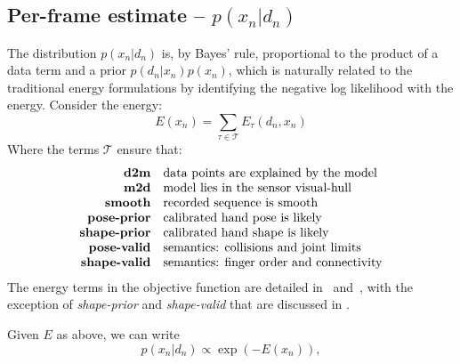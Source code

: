 \subsection{Per-frame estimate -- $p(x_n|d_n)$}
\label{sec:independent}
\label{sec:intra}
The distribution $p(x_n|d_n)$ is, by Bayes' rule, proportional to the product of a data term and a prior $p(d_n|x_n)p(x_n)$, which is naturally related to the traditional energy formulations by identifying the negative log likelihood with the energy.  Consider the energy:
% 
\begin{equation}
E(x_n) = \sum_{\tau \in \mathcal{T}} E_{\tau}(d_n, x_n) 
\label{eq:energies}
\end{equation}
% 
Where the terms $\mathcal{T}$ ensure that:
%
\begin{equation*}
\setlength{\jot}{0pt}
\begin{aligned}
\text{\textbf{d2m}} & \quad \text{data points are explained by the model} \\ 
\text{\textbf{m2d}} & \quad \text{model lies in the sensor visual-hull} \\
\text{\textbf{smooth}} & \quad \text{recorded sequence is smooth} \\
\text{\textbf{pose-prior}} & \quad \text{calibrated hand pose is likely} \\
\text{\textbf{shape-prior}} & \quad \text{calibrated hand shape is likely} \\
\text{\textbf{pose-valid}} & \quad \text{semantics: collisions and joint limits} \\
\text{\textbf{shape-valid}} & \quad \text{semantics: finger order and connectivity}
\end{aligned}
\end{equation*}
The energy terms in the objective function are detailed in~\cite{tkach2016sphere} and~\cite{htrack}, with the exception of \emph{shape-prior} and \emph{shape-valid} that are discussed in .
% 

Given $E$ as above, we can write
\begin{equation}
p(x_n|d_n) \propto \exp(-E(x_n)), 
\label{eq:p_from_E}
\end{equation}
